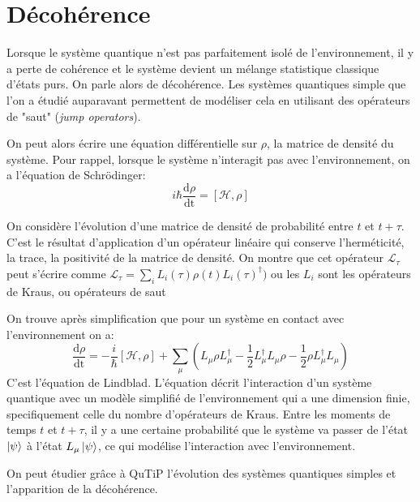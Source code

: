 \documentclass[11pt,a4paper]{article}
\begin{document}
	\section{Décohérence}
	Lorsque le système quantique n'est pas parfaitement isolé de l'environnement, il y a perte de cohérence et le système devient un mélange statistique classique d'états purs. On parle alors de décohérence.
	Les systèmes quantiques simple que l'on a étudié auparavant permettent de modéliser cela en utilisant des opérateurs de "saut" (\emph{jump operators}).
	
	On peut alors écrire une équation différentielle sur $\rho$, la matrice de densité du système. Pour rappel, lorsque le système n'interagit pas avec l'environnement, on a l'équation de Schrödinger:
	\[
	i\hbar \frac{\textrm{d}\rho}{\textrm{dt}}=\left[\mathcal{H},\rho\right]
	\]
	
	On considère l'évolution d'une matrice de densité de probabilité entre $t$ et $t+\tau$. C'est le résultat d'application d'un opérateur linéaire qui conserve l'herméticité, la trace, la positivité de la matrice de densité. On montre que cet opérateur $\mathcal{L_{\tau}}$ peut s'écrire comme $\mathcal{L_{\tau}}=\sum_i L_i(\tau)\rho(t)L_i(\tau)^{\dag})$ ou les $L_i$ sont les opérateurs de Kraus, ou opérateurs de saut
	
	
	On trouve après simplification que pour un système en contact avec l'environnement on a:
	\begin{equation}
	\frac{\textrm{d}\rho}{\textrm{dt}}=-\frac{i}{\hbar}\left[\mathcal{H},\rho\right]+\sum_{\mu}\left(
	L_{\mu}\rho L_{\mu}^{\dag}-\frac 12 L_{\mu}^{\dag}L_{\mu}\rho -\frac 12 \rho L_{\mu}^{\dag}L_{\mu}
	\right)
	\end{equation}
	C'est l'équation de Lindblad.
	L'équation décrit l'interaction d'un système quantique avec un modèle simplifié de l'environnement qui a une dimension finie, specifiquement celle du nombre d'opérateurs de Kraus. Entre les moments de temps $t$ et $t+\tau$, il y a une certaine probabilité que le système va passer de l'état $\ket{\psi}$ à l'état $L_{\mu}\ket{\psi}$, ce qui modélise l'interaction avec l'environnement.
	
	On peut étudier grâce à QuTiP l'évolution des systèmes quantiques simples et l'apparition de la décohérence.
	
\end{document}
